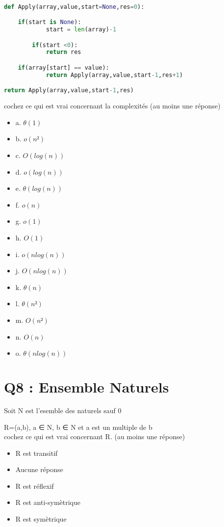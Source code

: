 \begin{lstlisting}[language=Python, caption=Python algorithme]

def Apply(array,value,start=None,res=0):

	if(start is None):
            start = len(array)-1

        if(start <0):
            return res

	if(array[start] == value):
            return Apply(array,value,start-1,res+1)

return Apply(array,value,start-1,res)
\end{lstlisting}

\vspace{5mm} %

cochez ce qui est vrai concernant la complexités (au moins une réponse)\\
\begin{itemize}[label=$\square$]
\item {a. $\theta(1)$}
\item {b. $o(n²)$}
\item {c. $O(log(n))$}
\item {d. $o(log(n))$}
\item {e. $\theta(log(n))$}
\item {f. $o(n)$}
\item {g. $o(1)$}
\item {h. $O(1)$}
\item {i. $o(n log(n))$}
\item {j. $O(n log(n))$}
\item {k. $\theta(n)$}
\item {l. $\theta(n²)$}
\item {m. $O(n²)$}
\item {n. $O(n)$}
\item {o. $\theta(n log(n))$}
\end{itemize}

\newpage
\section{Q8 : Ensemble Naturels}
\vspace{5mm} %

Soit N est l’esemble des naturels sauf 0

  R={(a,b), a ∈ N, b ∈ N et a est un multiple de b }\\


cochez ce qui est vrai concernant R. (au moins une réponse)\\
\begin{itemize}[label=$\square$]
\item R est transitif
\item Aucune réponse
\item R est réflexif
\item R est anti-symètrique
\item R est symètrique
\end{itemize}

